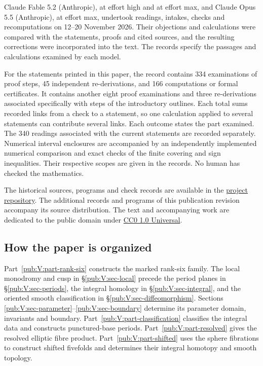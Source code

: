 \documentclass[11pt,a4paper]{article}
\numberwithin{equation}{section}
\theoremstyle{definition}
\newcommand{\SsixRepositoryCommit}{83d76022bcd442278b760db9ff438afceed6c6ea}
\begin{document}
Claude Fable 5.2 (Anthropic), at effort high and at effort max, and
Claude Opus 5.5 (Anthropic), at effort max, undertook readings, intakes,
checks and recomputations on 12--20 November 2026. Their objections
and calculations were compared with the statements, proofs and cited
sources, and the resulting corrections were incorporated into the text.
The records specify the passages and calculations examined by each model.

For the statements printed in this paper, the record contains
334 examinations of proof steps, 45 independent re-derivations, and
166 computations or formal certificates. It contains another eight
proof examinations and three re-derivations associated specifically
with steps of the introductory outlines. Each total sums recorded
links from a check to a statement, so one calculation applied to several
statements can contribute several links. Each outcome states the part
examined. The 340 readings associated with the current statements are
recorded separately. Numerical interval enclosures are accompanied by
an independently implemented numerical comparison and exact checks of
the finite covering and sign inequalities. Their respective scopes are
given in the records. No human has checked the mathematics.

The historical sources, programs and check records are available in the
\href{https://github.com/KokunoYumeto/s6-complex-structure-workbench/tree/\SsixRepositoryCommit/pro_returns/S6_SERIES_GRIND_checkpoint_10_20261120T0211Z/}{project repository}.
The additional records and programs of this publication revision
accompany its source distribution.
The text and accompanying work are dedicated to the public domain under
\href{https://creativecommons.org/publicdomain/zero/1.0/}{CC0 1.0 Universal}.

\subsection{How the paper is organized}
Part~\ref{pub:V:part-rank-six} constructs the marked rank-six family.
The local monodromy and cusp in \S\ref{pub:V:sec-local} precede the
period planes in \S\ref{pub:V:sec-periods}, the integral homology in
\S\ref{pub:V:sec-integral}, and the oriented smooth classification
in \S\ref{pub:V:sec-diffeomorphism}. Sections
\ref{pub:V:sec-parameter}--\ref{pub:V:sec-boundary} determine its
parameter domain, invariants and boundary.
Part~\ref{pub:V:part-classification} classifies the integral data and
constructs punctured-base periods. Part~\ref{pub:V:part-resolved}
gives the resolved elliptic fibre product. Part~\ref{pub:V:part-shifted}
uses the sphere fibrations to construct shifted fivefolds and determines
their integral homotopy and smooth topology.
\end{document}

